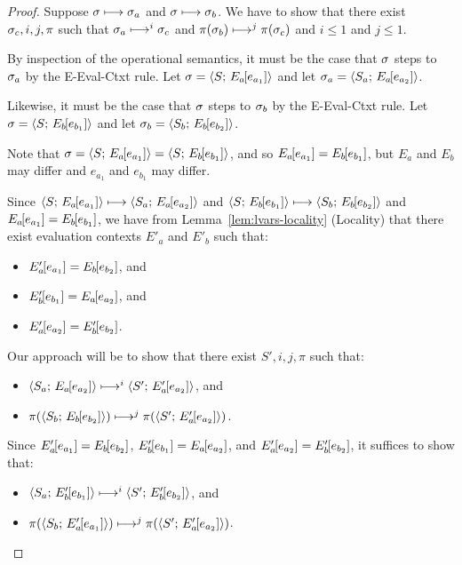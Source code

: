 \begin{proof}
  Suppose $\sigma \longmapsto \sigma_a$ and $\sigma \longmapsto \sigma_b$.
  We have to show that there exist $\sigma_c, i, j, \pi$ such that
  $\sigma_a \longmapsto^i \sigma_c$ and $\pi(\sigma_b) \longmapsto^j
  \pi(\sigma_c)$ and $i \leq 1$ and $j \leq 1$.

  By inspection of the operational semantics, it must be the case that
  $\sigma$ steps to $\sigma_a$ by the {\sc E-Eval-Ctxt} rule.  Let
  $\sigma = \langle S;\, E_a\hspace{-1mm}\left[e_{a_1}\right] \rangle$ and let $\sigma_a =
  \langle S_a;\, E_a\hspace{-1mm}\left[e_{a_2}\right] \rangle$.

  Likewise, it must be the case that $\sigma$ steps to $\sigma_b$ by the
  {\sc E-Eval-Ctxt} rule.  Let $\sigma =
  \langle S;\, E_b\hspace{-1mm}\left[e_{b_1}\right] \rangle$ and let $\sigma_b =
  \langle S_b;\, E_b\hspace{-1mm}\left[e_{b_2}\right] \rangle$.

  Note that $\sigma = \langle S;\, E_a\hspace{-1mm}\left[e_{a_1}\right] \rangle =
  \langle S;\, E_b\hspace{-1mm}\left[e_{b_1}\right] \rangle$, and so
  $E_a\hspace{-1mm}\left[e_{a_1}\right] = E_b\hspace{-1mm}\left[e_{b_1}\right]$, but $E_a$ and
  $E_b$ may differ and $e_{a_1}$ and $e_{b_1}$ may differ.

  Since $\langle S;\, E_a\hspace{-1mm}\left[e_{a_1}\right] \rangle \longmapsto
  \langle S_a;\, E_a\hspace{-1mm}\left[e_{a_2}\right] \rangle$ and
  $\langle S;\, E_b\hspace{-1mm}\left[e_{b_1}\right] \rangle \longmapsto
  \langle S_b;\, E_b\hspace{-1mm}\left[e_{b_2}\right] \rangle$ and $E_a\hspace{-1mm}\left[e_{a_1}\right]
  = E_b\hspace{-1mm}\left[e_{b_1}\right]$, we have from
  Lemma~\ref{lem:lvars-locality} (Locality) that there exist
  evaluation contexts $E'_a$ and $E'_b$ such that:

  \begin{itemize}
  \item $E'_a\hspace{-1mm}\left[e_{a_1}\right] = E_b\hspace{-1mm}\left[e_{b_2}\right]$, and
  \item $E'_b\hspace{-1mm}\left[e_{b_1}\right] = E_a\hspace{-1mm}\left[e_{a_2}\right]$, and
  \item $E'_a\hspace{-1mm}\left[e_{a_2}\right] =
  E'_b\hspace{-1mm}\left[e_{b_2}\right]$.
  \end{itemize}

  Our approach will be to show that there exist $S', i, j, \pi$ such
  that:
  \begin{itemize}
  \item $\langle S_a;\, E_a\hspace{-1mm}\left[e_{a_2}\right] \rangle \longmapsto^i
    \langle S';\, E'_a\hspace{-1mm}\left[e_{a_2}\right] \rangle$, and
  \item $\pi(\langle S_b;\, E_b\hspace{-1mm}\left[e_{b_2}\right] \rangle) \longmapsto^j
    \pi(\langle S';\, E'_a\hspace{-1mm}\left[e_{a_2}\right] \rangle)$.
  \end{itemize}
  Since $E'_a\hspace{-1mm}\left[e_{a_1}\right] = E_b\hspace{-1mm}\left[e_{b_2}\right]$,
  $E'_b\hspace{-1mm}\left[e_{b_1}\right] = E_a\hspace{-1mm}\left[e_{a_2}\right]$, and
  $E'_a\hspace{-1mm}\left[e_{a_2}\right] = E'_b\hspace{-1mm}\left[e_{b_2}\right]$, it suffices
  to show that:
  \begin{itemize}
  \item $\langle S_a;\, E'_b\hspace{-1mm}\left[e_{b_1}\right] \rangle \longmapsto^i
    \langle S';\, E'_b\hspace{-1mm}\left[e_{b_2}\right] \rangle$, and
  \item $\pi(\langle S_b;\, E'_a\hspace{-1mm}\left[e_{a_1}\right] \rangle) \longmapsto^j
    \pi(\langle S';\, E'_a\hspace{-1mm}\left[e_{a_2}\right] \rangle)$.
  \end{itemize}


\end{proof}
